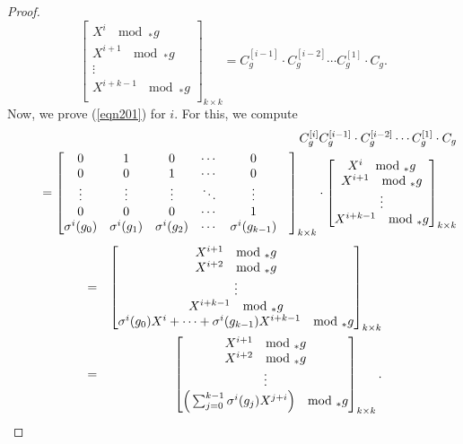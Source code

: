 \documentclass[10pt,a4paper]{amsart}
\begin{document}
\begin{proof}
	$$\begin{bmatrix}\label{eqn5.8}
		X^i ~ \mod _*g  \\
		X^{i+1} ~ \mod _*g  \\
		\vdots\\
		X^{i+k-1} ~ \mod _*g  \\
	\end{bmatrix}_{k\times k}=
	C_g^{[i-1]}\cdot C_g^{[i-2]}\cdots C_g^{[1]}\cdot C_g.$$
	Now, we prove (\ref{eqn201}) for $i$. For this, we compute 
    \begin{eqnarray*}
        \notag&~&C^{[i]}_g C_g^{[i-1]}\cdot C_g^{[i-2]}\cdots C_g^{[1]}\cdot C_g\\
		\notag&~~~~~&	=\begin{bmatrix}
			0&1&0&\cdots&0\\
			0&0&1&\cdots&0\\
			\vdots&\vdots&\vdots&\ddots&\vdots&\\
			0&0&0&\cdots&1\\
			\sigma^{i}(g_0)&\sigma^{i}(g_1)&\sigma^{i}(g_2)&\cdots&\sigma^{i}(g_{k-1})
		\end{bmatrix}_{k\times k} \cdot \begin{bmatrix}
			X^i ~ \mod _*g  \\
			X^{i+1} ~ \mod _*g \\
			\vdots\\
			X^{i+k-1} ~ \mod _*g \\
		\end{bmatrix}_{k\times k}\\
    \end{eqnarray*}
	\begin{eqnarray}\label{eqn11}
		\notag&=&\begin{bmatrix}
			X^{i+1}~ \mod _*g  \\
			X^{i+2}~ \mod _*g  \\
			\vdots\\
			X^{i+k-1}~\mod_*g\\
            \sigma^{i}(g_0)X^i+\cdots+\sigma^{i}(g_{k-1})X^{i+k-1}~ \mod _*g  
		\end{bmatrix}_{k\times k}\\
		&=&\begin{bmatrix}
			X^{i+1}~ \mod _*g \\
			X^{i+2}~ \mod _*g  \\
			\vdots\\
			\Big(\sum_{j=0}^{k-1}\sigma^{i}(g_j)X^{j+i}\Big)~ \mod _*g  \\
		\end{bmatrix}_{k\times k}.
	\end{eqnarray}
	\normalsize
    

\end{proof}
\end{document}
